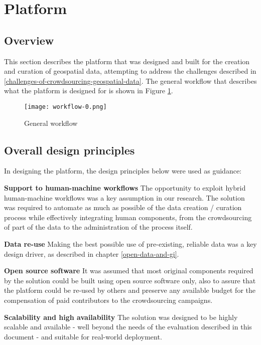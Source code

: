 \section{Platform}

\subsection{Overview}

This section describes the platform that was designed and built for the creation and curation of geospatial data, attempting to address the challenges described in \ref{challenges-of-crowdsourcing-geospatial-data}. The general workflow that describes what the platform is designed for is shown in Figure \ref{fig:workflow_0}.

\begin{figure}
	\texttt{[image: workflow-0.png]}
	\caption{General workflow}
	\label{fig:workflow_0}
\end{figure}

\subsection{Overall design principles}

In designing the platform, the design principles below were used as guidance:

\textbf{Support to human-machine workflows} The opportunity to exploit hybrid human-machine workflows was a key assumption in our research. The solution was required to automate as much as possible of the data creation / curation process while effectively integrating human components, from the crowdsourcing of part of the data to the administration of the process itself.

\textbf{Data re-use} Making the best possible use of pre-existing, reliable data was a key design driver, as described in chapter \ref{open-data-and-gi}.

\textbf{Open source software} It was assumed that most original components required by the solution could be built using open source software only, also to assure that the platform could be re-used by others and preserve any available budget for the compensation of paid contributors to the crowdsourcing campaigns.

\textbf{Scalability and high availability} The solution was designed to be highly scalable and available - well beyond the needs of the evaluation described in this document - and suitable for real-world deployment.

